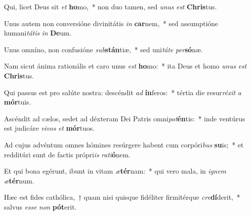 \item Qui, licet Deus sit \textit{et} \textbf{ho}mo,~* non duo tamen, sed \textit{u}\textit{nus} \textit{est} \textbf{Chris}tus.
\item Unus autem non conversióne divinitátis \textit{in} \textbf{car}nem,~* sed assumptióne humani\textit{tá}\textit{tis} \textit{in} \textbf{De}um.
\item Unus omníno, non confusióne \textit{sub}\textbf{stán}tiæ,~* sed uni\textit{tá}\textit{te} \textit{per}\textbf{só}næ.
\item Nam sicut ánima rationális et caro unus \textit{est} \textbf{ho}mo:~* ita Deus et homo \textit{u}\textit{nus} \textit{est} \textbf{Chris}tus.
\item Qui passus est pro salúte nostra: descéndit \textit{ad} \textbf{ín}feros:~* tértia die resur\textit{ré}\textit{xit} \textit{a} \textbf{mór}tuis.
\item Ascéndit ad cælos, sedet ad déxteram Dei Patris omni\textit{pot}\textbf{én}tis:~* inde ventúrus est judicáre \textit{vi}\textit{vos} \textit{et} \textbf{mór}tuos.
\item Ad cujus advéntum omnes hómines resúrgere habent cum corpóri\textit{bus} \textbf{su}is;~* et redditúri sunt de factis própri\textit{is} \textit{ra}\textit{ti}\textbf{ó}nem.
\item Et qui bona egérunt, ibunt in vitam \textit{æ}\textbf{tér}nam:~* qui vero mala, in \textit{i}\textit{gnem} \textit{æ}\textbf{tér}num.
\item Hæc est fides cathólica,~† quam nisi quisque fidéliter firmitérque \textit{cre}\textbf{dí}derit,~* salvus \textit{es}\textit{se} \textit{non} \textbf{pót}erit.
